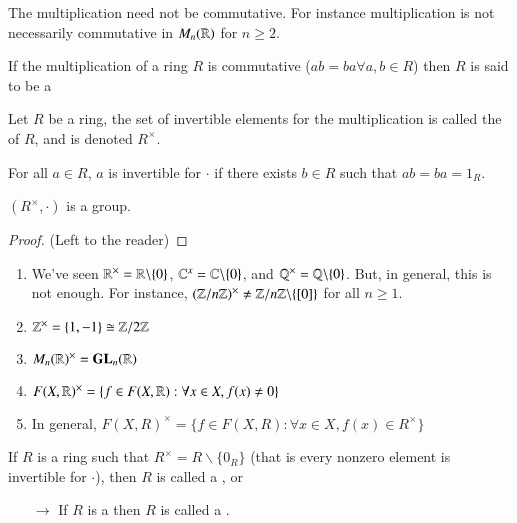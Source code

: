 \begin{note}
    The multiplication need not be commutative. For instance multiplication is not necessarily commutative in $M_n(\mathbb R)$ for $n \geq 2$.
\end{note}


\begin{definition}
    If the multiplication of a ring $R$ is commutative ($ab = ba \forall a,b\in R$) then $R$ is said to be a 
\end{definition}


\begin{definition}
    Let $R$ be a ring, the set of invertible elements for the multiplication is called the  of $R$, and is denoted $R^{\times}$.
\end{definition}

\begin{remark}
    For all $a \in R$, $a$ is invertible for $\cdot$ if there exists $b \in R$ such that $ab = ba = 1_R$.
\end{remark}

\begin{exercise}
    $(R^{\times}, \cdot)$ is a group.
    \begin{proof}
        (Left to the reader)
    \end{proof}
\end{exercise}

\begin{example}
    \leavevmode
    \begin{enumerate}
        \item We've seen $\mathbb R^{\times} = \mathbb R\backslash\{0\}$, $\mathbb C^{x} = \mathbb C\backslash\{0\}$, and $\mathbb Q^{\times} = \mathbb Q\backslash\{0\}$. But, in general, this is not enough. For instance, $(\mathbb Z/n\mathbb Z)^{\times} \neq \mathbb Z/n\mathbb Z\backslash\{[0]\}$ for all $n \geq 1$.
        \item $\mathbb Z^{\times} = \{1,-1\}\cong  \mathbb Z/2\mathbb Z$
        \item $M_n(\mathbb R)^{\times} = \mathbf{GL}_n(\mathbb R)$
        \item $F(X,\mathbb R)^{\times} = \{f\in F(X,\mathbb R):\forall x \in X, f(x) \neq 0\}$
        \item In general, $F(X,R)^{\times} = \{f \in F(X,R):\forall x \in X, f(x) \in R^{\times}\}$
    \end{enumerate}
\end{example}

\begin{definition}
    If $R$ is a ring such that $R^{\times} = R\backslash\{0_R\}$ (that is every nonzero element is invertible for $\cdot$), then $R$ is called a , or 
    \begin{enumerate}
        \item[$\rightarrow$] If $R$ is a  then $R$ is called a . 
    \end{enumerate}
\end{definition}


